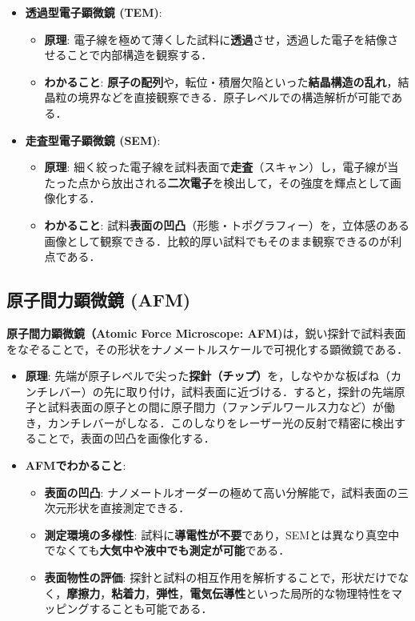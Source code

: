 \documentclass[11pt,a4paper]{ltjsarticle}
\newcommand{\supcite}[1]{\textsuperscript{\cite{#1}}}
\begin{document}
\begin{itemize}
\item \textbf{透過型電子顕微鏡 (TEM)}:
  \begin{itemize}
  \item \textbf{原理}: 電子線を極めて薄くした試料に\textbf{透過}させ，透過した電子を結像させることで内部構造を観察する\supcite{ref1}．
  \item \textbf{わかること}: \textbf{原子の配列}や，転位・積層欠陥といった\textbf{結晶構造の乱れ}，結晶粒の境界などを直接観察できる．原子レベルでの構造解析が可能である\supcite{ref1}．
  \end{itemize}

\item \textbf{走査型電子顕微鏡 (SEM)}:
  \begin{itemize}
  \item \textbf{原理}: 細く絞った電子線を試料表面で\textbf{走査}（スキャン）し，電子線が当たった点から放出される\textbf{二次電子}を検出して，その強度を輝点として画像化する\supcite{ref1}．
  \item \textbf{わかること}: 試料\textbf{表面の凹凸}（形態・トポグラフィー）を，立体感のある画像として観察できる．比較的厚い試料でもそのまま観察できるのが利点である\supcite{ref1}．
  \end{itemize}
\end{itemize}

\subsection{原子間力顕微鏡 (AFM)}

\textbf{原子間力顕微鏡（Atomic Force Microscope: AFM)}は，鋭い探針で試料表面をなぞることで，その形状をナノメートルスケールで可視化する顕微鏡である\supcite{ref1}．

\begin{itemize}
\item \textbf{原理}: 先端が原子レベルで尖った\textbf{探針（チップ）}を，しなやかな板ばね（カンチレバー）の先に取り付け，試料表面に近づける．すると，探針の先端原子と試料表面の原子との間に原子間力（ファンデルワールス力など）が働き，カンチレバーがしなる．このしなりをレーザー光の反射で精密に検出することで，表面の凹凸を画像化する\supcite{ref1}．

\item \textbf{AFMでわかること}:
  \begin{itemize}
  \item \textbf{表面の凹凸}: ナノメートルオーダーの極めて高い分解能で，試料表面の三次元形状を直接測定できる\supcite{ref1}．
  \item \textbf{測定環境の多様性}: 試料に\textbf{導電性が不要}であり，SEMとは異なり真空中でなくても\textbf{大気中や液中でも測定が可能}である\supcite{ref1}．
  \item \textbf{表面物性の評価}: 探針と試料の相互作用を解析することで，形状だけでなく，\textbf{摩擦力}，\textbf{粘着力}，\textbf{弾性}，\textbf{電気伝導性}といった局所的な物理特性をマッピングすることも可能である\supcite{ref1}．
  \end{itemize}
\end{itemize}
\end{document}
